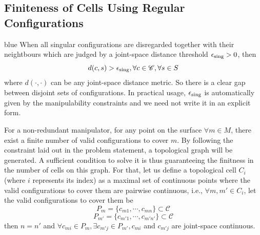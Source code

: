 \documentclass[Afour,sageh,times]{sagej}
\begin{document}
\subsection{Finiteness of Cells Using Regular Configurations}\label{subsection_regular_finiteness}
\begin{color}{blue}
When all singular configurations are disregarded together with their neightbours which are judged by a joint-space distance threshold $\epsilon_{\rm sing} > 0$, then 
\begin{equation}\label{equ_threshold}
d(c, s) > \epsilon_{\rm sing}, \forall c\in \mathscr{C}, \forall s\in S
\end{equation}
where $d(\cdot, \cdot)$ can be any joint-space distance metric. So there is a clear gap between disjoint sets of configurations. In practical usage, $\epsilon_{\rm sing}$ is automatically given by the manipulability constraints and we need not write it in an explicit form. 
\end{color}

For a non-redundant manipulator, for any point on the surface $\forall m\in M$, there exist a finite number of valid configurations to cover $m$. 
By following the constraint laid out in the problem statement, a topological graph will be generated. 
A sufficient condition to solve it is thus guaranteeing the finitness in the number of cells on this graph. For that, let us define a topological 
cell $C_i$ (where $i$ represents its index) as a maximal set of continuous points where the valid configurations to cover them are 
pairwise continuous, i.e., $\forall m, m'\in C_i$, let the valid configurations to cover them be 
\begin{equation}\label{equ_pm}
P_{m} = \{c_{m1}, \cdots, c_{mn}\}\subset \mathscr{C}
\end{equation}
\begin{equation}\label{equ_pm'}
P_{m'} = \{c_{m'1}, \cdots, c_{m'n'}\}\subset \mathscr{C}
\end{equation}
then $n = n'$ and
$\forall c_{mi}\in P_m, \exists c_{m'j} \in P_{m'}, c_{mi}$ and $ c_{m'j}$ are joint-space continuous.
\end{document}
